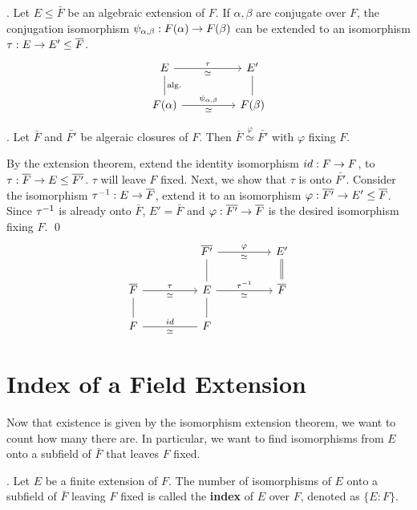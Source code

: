 \pagebreak

\cor. Let \(E \leq \bar{F}\) be an algebraic extension of \(F\). If \(\alpha, \beta\) are conjugate over \(F\), the conjugation isomorphism \(\psi_{\alpha, \beta} : F(\alpha) \rightarrow F(\beta)\) can be extended to an isomorphism \(\tau : E \ra E' \leq \bar{F}\).
\[
    \begin{tikzcd}
        E \arrow[dash]{d}{\text{alg.}} \arrow{rr}{\tau}[swap]{\simeq} & & E' \arrow[dash]{d} \\
        F(\alpha) \arrow{rr}{\psi_{\alpha, \beta}}[swap]{\simeq} & & F(\beta)
    \end{tikzcd}
\]

\cor. Let \(\bar{F}\) and \(\bar{F'}\) be algeraic closures of \(F\). Then \(\bar{F} \overset{\varphi}{\simeq} \bar{F'}\) with \(\varphi\) fixing \(F\).

\pf By the extension theorem, extend the identity isomorphism \(id : F \rightarrow F\), to \(\tau : \bar{F} \ra E \leq \bar{F'}\). \(\tau\) will leave \(F\) fixed. Next, we show that \(\tau\) is onto \(\bar{F'}\). Consider the isomorphism \(\tau\inv : E \ra \bar{F}\), extend it to an isomorphism \(\varphi : \bar{F'} \ra E' \leq \bar{F}\). Since \(\tau^{-1}\) is already onto \(\bar{F}\), \(E' = \bar{F}\) and \(\varphi : \bar{F'} \ra \bar{F}\) is the desired isomorphism fixing \(F\). \qed
\[
    \begin{tikzcd}
        & & \bar{F'} \arrow[dash]{d} \arrow{rr}{\varphi}[swap]{\simeq} & & E' \arrow[equal]{d}\\
        \bar{F} \arrow[dash]{d} \arrow{rr}{\tau}[swap]{\simeq} & & E \arrow[dash]{d} \arrow{rr}{\tau\inv}[swap]{\simeq} & & \bar{F} \\
        F \arrow[dash]{rr}{id}[swap]{\simeq} & & F
    \end{tikzcd}
\]

\section*{Index of a Field Extension}

Now that existence is given by the isomorphism extension theorem, we want to count how many there are. In particular, we want to find isomorphisms from \(E\) onto a subfield of \(\bar{F}\) that leaves \(F\) fixed.

.  Let \(E\) be a finite extension of \(F\). The number of isomorphisms of \(E\) onto a subfield of \(\bar{F}\) leaving \(F\) fixed is called the \textbf{index} of \(E\) over \(F\), denoted as \(\{E : F\}\).

